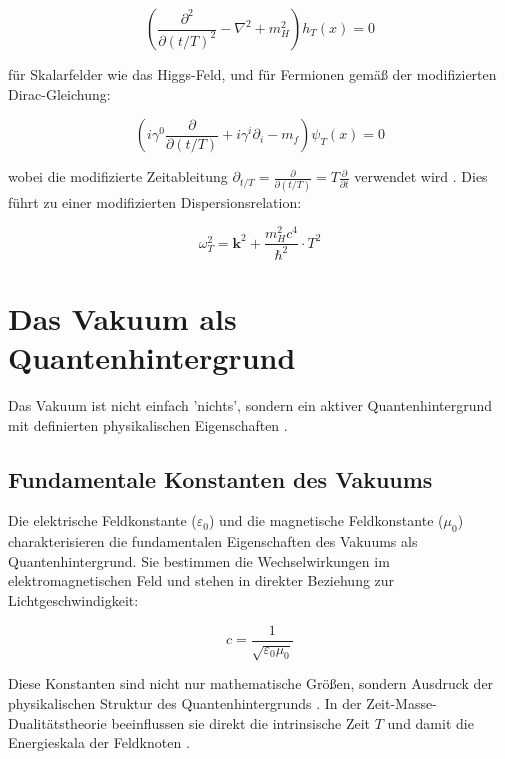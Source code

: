 \documentclass[a4paper,12pt]{article}
\begin{document}
	\begin{equation}
		\left(\frac{\partial^2}{\partial(t/T)^2} - \nabla^2 + m_H^2\right) h_T(x) = 0
	\end{equation}
	
	für Skalarfelder wie das Higgs-Feld, und für Fermionen gemäß der modifizierten Dirac-Gleichung:
	
	\begin{equation}
		\left(i\gamma^0\frac{\partial}{\partial(t/T)} + i\gamma^i\partial_i - m_f\right) \psi_T(x) = 0
	\end{equation}
	
	wobei die modifizierte Zeitableitung $\partial_{t/T} = \frac{\partial}{\partial(t/T)} = T\frac{\partial}{\partial t}$ verwendet wird \cite{Pascher2024}. Dies führt zu einer modifizierten Dispersionsrelation:
	
	\begin{equation}
		\omega_T^2 = \mathbf{k}^2 + \frac{m_H^2 c^4}{\hbar^2} \cdot T^2
	\end{equation}
	
	\section{Das Vakuum als Quantenhintergrund}
	
	Das Vakuum ist nicht einfach 'nichts', sondern ein aktiver Quantenhintergrund mit definierten physikalischen Eigenschaften \cite{Milonni1994}.
	
	\subsection{Fundamentale Konstanten des Vakuums}
	
	Die elektrische Feldkonstante ($\varepsilon_0$) und die magnetische Feldkonstante ($\mu_0$) charakterisieren die fundamentalen Eigenschaften des Vakuums als Quantenhintergrund. Sie bestimmen die Wechselwirkungen im elektromagnetischen Feld und stehen in direkter Beziehung zur Lichtgeschwindigkeit:
	
	\begin{equation}
		c = \frac{1}{\sqrt{\varepsilon_0 \mu_0}}
	\end{equation}
	
	Diese Konstanten sind nicht nur mathematische Größen, sondern Ausdruck der physikalischen Struktur des Quantenhintergrunds \cite{Aitchison2004}. In der Zeit-Masse-Dualitätstheorie beeinflussen sie direkt die intrinsische Zeit $T$ und damit die Energieskala der Feldknoten \cite{Pascher2024}.
	
\end{document}
